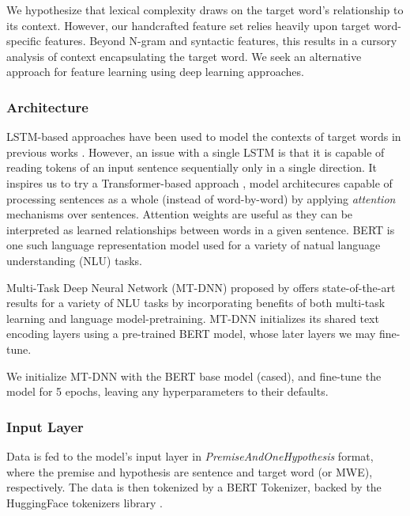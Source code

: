 \documentclass[11pt,a4paper]{article}
\begin{document}
We hypothesize that lexical complexity draws on the target word's relationship to its context. However, our handcrafted feature set relies heavily upon target word-specific features. Beyond N-gram and syntactic features, this results in a cursory analysis of context encapsulating the target word. We seek an alternative approach for feature learning using deep learning approaches.

\subsubsection{Architecture}

LSTM-based approaches have been used to model the contexts of target words in previous works \citep{hartmanndossantos2018nilc, dehertogtack2018deep}. However, an issue with a single LSTM is that it is capable of reading tokens of an input sentence sequentially only in a single direction. It inspires us to try a Transformer-based approach \citep{DBLP:journals/corr/VaswaniSPUJGKP17}, model architecures capable of processing sentences as a whole (instead of word-by-word) by applying \textit{attention} mechanisms over sentences. Attention weights are useful as they can be interpreted as learned relationships between words in a given sentence. BERT \citep{DBLP:journals/corr/abs-1810-04805} is one such language representation model used for a variety of natual language understanding (NLU) tasks.

Multi-Task Deep Neural Network (MT-DNN) proposed by \citet{liuetal2019multitask} offers state-of-the-art results for a variety of NLU tasks by incorporating benefits of both multi-task learning and language model-pretraining. MT-DNN initializes its shared text encoding layers using a pre-trained BERT model, whose later layers we may fine-tune.

We initialize MT-DNN with the BERT base model (cased), and fine-tune the model for 5 epochs, leaving any hyperparameters to their defaults.

\subsubsection{Input Layer}

Data is fed to the model's input layer in \textit{PremiseAndOneHypothesis} format, where the premise and hypothesis are sentence and target word (or MWE), respectively. The data is then tokenized by a BERT Tokenizer, backed by the HuggingFace tokenizers library \citep{wolf_etal_2020_transformers}.
\end{document}
